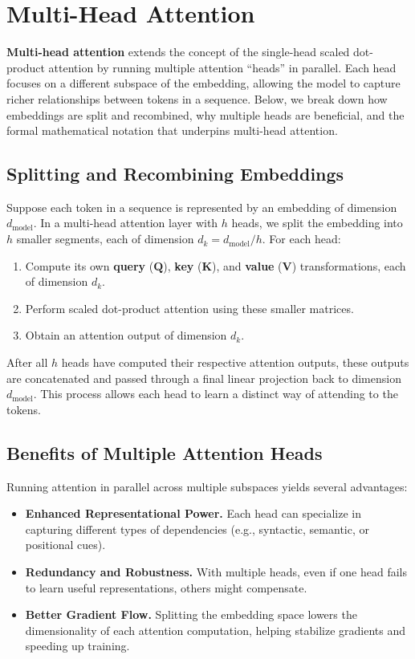 \section{Multi-Head Attention}
\label{sec:multi_head_attention}

\noindent
\textbf{Multi-head attention} extends the concept of the single-head scaled dot-product attention by running multiple attention “heads” in parallel. Each head focuses on a different subspace of the embedding, allowing the model to capture richer relationships between tokens in a sequence. Below, we break down how embeddings are split and recombined, why multiple heads are beneficial, and the formal mathematical notation that underpins multi-head attention.

\subsection{Splitting and Recombining Embeddings}
Suppose each token in a sequence is represented by an embedding of dimension $d_\text{model}$. In a multi-head attention layer with $h$ heads, we split the embedding into $h$ smaller segments, each of dimension $d_k = d_\text{model} / h$. For each head:
\begin{enumerate}
    \item Compute its own \textbf{query} ($\mathbf{Q}$), \textbf{key} ($\mathbf{K}$), and \textbf{value} ($\mathbf{V}$) transformations, each of dimension $d_k$.
    \item Perform scaled dot-product attention using these smaller matrices.
    \item Obtain an attention output of dimension $d_k$.
\end{enumerate}
After all $h$ heads have computed their respective attention outputs, these outputs are concatenated and passed through a final linear projection back to dimension $d_\text{model}$. This process allows each head to learn a distinct way of attending to the tokens.

\subsection{Benefits of Multiple Attention Heads}
\noindent
Running attention in parallel across multiple subspaces yields several advantages:
\begin{itemize}
    \item \textbf{Enhanced Representational Power.} Each head can specialize in capturing different types of dependencies (e.g., syntactic, semantic, or positional cues).
    \item \textbf{Redundancy and Robustness.} With multiple heads, even if one head fails to learn useful representations, others might compensate.
    \item \textbf{Better Gradient Flow.} Splitting the embedding space lowers the dimensionality of each attention computation, helping stabilize gradients and speeding up training.
\end{itemize}

